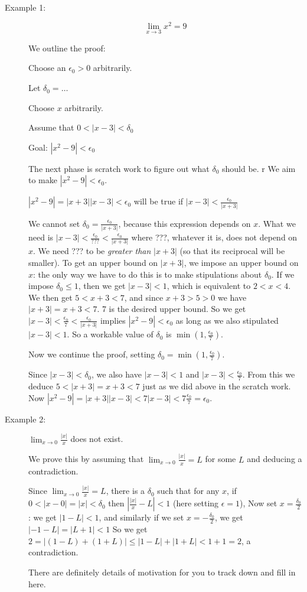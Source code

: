 \documentclass[12pt]{article}
\begin{document}
\begin{description}

\item[Example 1:]  $$\lim_{x\rightarrow 3} x^2=9$$

We outline the proof:

Choose an $\epsilon_0>0$ arbitrarily.

Let $\delta_0 = \ldots$

Choose $x$ arbitrarily.

Assume that $0<|x-3|<\delta_0$

Goal:  $|x^2-9|<\epsilon_0$

The next phase is scratch work to figure out what $\delta_0$ should be.
r
We aim to make $|x^2-9|<\epsilon_0$.

$|x^2-9| = |x+3||x-3| < \epsilon_0$ will be true if $|x-3|<\frac{\epsilon_0}{|x+3|}$

We  cannot set $\delta_0=\frac{\epsilon_0}{|x+3|}$, because this expression depends on $x$.  What we need is
$|x-3|< \frac{\epsilon_0}{???}< \frac{\epsilon_0}{|x+3|}$ where ???, whatever it is, does not depend on $x$.
We need ??? to be {\em greater than\/} $|x+3|$ (so that its reciprocal will be smaller).  To get an upper bound on $|x+3|$,
we impose an upper bound on $x$:  the only way we have to do this is to make stipulations about $\delta_0$.
If we impose $\delta_0 \leq 1$, then we get $|x-3|<1$, which is equivalent to $2<x<4$.  We then get $5 <x+3<7$,
and since $x+3>5>0$ we have $|x+3|=x+3<7$.  7 is the desired upper bound.  So we get $|x-3|< \frac{\epsilon_0}{7}< \frac{\epsilon_0}{|x+3|}$ implies $|x^2-9|<\epsilon_0$ as long as we also stipulated $|x-3|<1$.  So a workable value
of $\delta_0$ is $\min(1,\frac{\epsilon_0}7)$.

Now we continue the proof, setting $\delta_0 = \min(1,\frac{\epsilon_0}7)$.  

Since $|x-3|<\delta_0$, we also have $|x-3|<1$ and $|x-3|<\frac{\epsilon_0}7$.  From this we deduce $5<|x+3|=x+3<7$ just as we did above in the scratch work.  Now $|x^2-9|=|x+3||x-3|<7|x-3|<7\frac{\epsilon_0}7=\epsilon_0$.

\item[Example 2:]  $\lim_{x \rightarrow 0}\frac{|x|}x$  does not exist.

We prove this by assuming that $\lim_{x \rightarrow 0}\frac{|x|}x=L$  for some $L$ and deducing a contradiction.

Since  $\lim_{x \rightarrow 0}\frac{|x|}x=L$, there is a $\delta_0$ such that for any $x$, if $0<|x-0|=|x|<\delta_0$
then $|\frac{|x|}x-L|<1$  (here setting $\epsilon=1$),  Now set $x=\frac{\delta_0}2$:  we get $|1-L|<1$,
and similarly if we set $x=-\frac{\delta_0}2$, we get $|-1-L|=|L+1|< 1$  So we get $2=|(1-L)+(1+L)| \leq |1-L|+|1+L|<1+1=2$, a contradiction.

There are definitely details of motivation for you to track down and fill in here.

\end{description}
\end{document}
